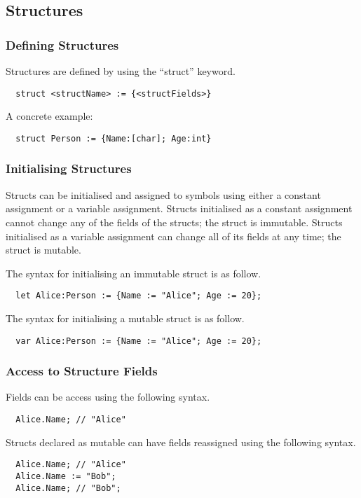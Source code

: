 \subsection{Structures}
\label{subsec:structs}

\subsubsection{Defining Structures}
\label{sec:defStructures}

Structures are defined by using the \enquote{struct} keyword. 

\begin{verbatim}
  struct <structName> := {<structFields>}
\end{verbatim}

A concrete example:

\begin{verbatim}
  struct Person := {Name:[char]; Age:int}
\end{verbatim}

\subsubsection{Initialising Structures}
\label{sec:initStructures}

Structs can be initialised and assigned to symbols using either a constant assignment or a variable assignment. Structs initialised as a constant assignment cannot change any of the fields of the structs; the struct is immutable. Structs initialised as a variable assignment can change all of its fields at any time; the struct is mutable.

The syntax for initialising an immutable struct is as follow.

\begin{verbatim}
  let Alice:Person := {Name := "Alice"; Age := 20};
\end{verbatim}

The syntax for initialising a mutable struct is as follow.

\begin{verbatim}
  var Alice:Person := {Name := "Alice"; Age := 20};
\end{verbatim}

\subsubsection{Access to Structure Fields}
\label{sec:accessStructFields}

Fields can be access using the following syntax.

\begin{verbatim}
  Alice.Name; // "Alice"
\end{verbatim}

Structs declared as mutable can have fields reassigned using the following syntax.

\begin{verbatim}
  Alice.Name; // "Alice"
  Alice.Name := "Bob";
  Alice.Name; // "Bob";
\end{verbatim}
